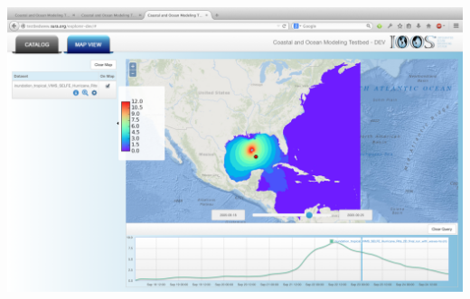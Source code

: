 \documentclass[noback,noborder,portrait,twocolumn]{cuposter}
\begin{document}
\figspace{}
\begin{minipage}[t]{\linewidth}
  \centering
  \includegraphics[width=\linewidth]{../figs/inundation_tropical_VIMS_SELFE_hurricane_rita_2d_final_run_with_waves_sea_surface_wave_significant_height}
\end{minipage}
\end{document}
